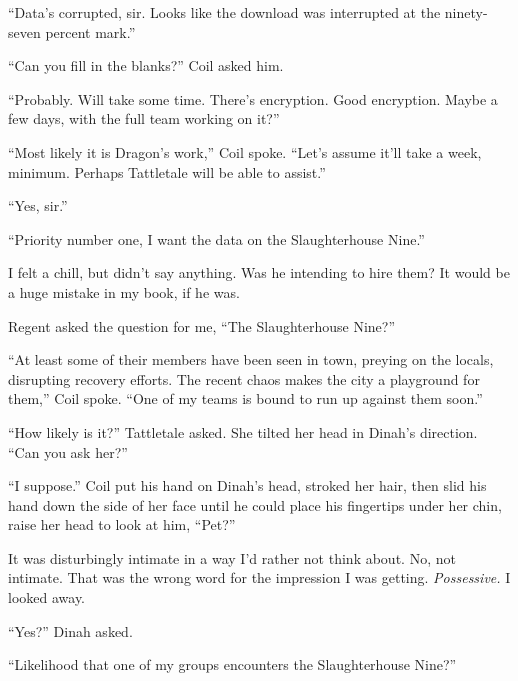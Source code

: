 ``Data's corrupted, sir.  Looks like the download was interrupted at the ninety-seven percent mark.''



``Can you fill in the blanks?'' Coil asked him.



``Probably.  Will take some time.  There's encryption.  Good encryption.  Maybe a few days, with the full team working on it?''



``Most likely it is Dragon's work,'' Coil spoke. ``Let's assume it'll take a week, minimum.  Perhaps Tattletale will be able to assist.''



``Yes, sir.''



``Priority number one, I want the data on the Slaughterhouse Nine.''



I felt a chill, but didn't say anything.  Was he intending to hire them?  It would be a huge mistake in my book, if he was.



Regent asked the question for me, ``The Slaughterhouse Nine?''



``At least some of their members have been seen in town, preying on the locals, disrupting recovery efforts.  The recent chaos makes the city a playground for them,'' Coil spoke.  ``One of my teams is bound to run up against them soon.''



``How likely is it?'' Tattletale asked.  She tilted her head in Dinah's direction.  ``Can you ask her?''



``I suppose.''  Coil put his hand on Dinah's head, stroked her hair, then slid his hand down the side of her face until he could place his fingertips under her chin, raise her head to look at him, ``Pet?''



It was disturbingly intimate in a way I'd rather not think about.  No, not intimate.  That was the wrong word for the impression I was getting.  \emph{Possessive.}  I looked away.



``Yes?'' Dinah asked.



``Likelihood that one of my groups encounters the Slaughterhouse Nine?''



